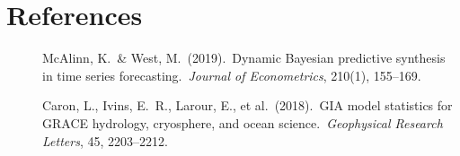 \documentclass[11pt]{article}
\begin{document}
\section*{References}

\begin{description}
  \item[] McAlinn, K.\ \& West, M.\ (2019).\ Dynamic Bayesian predictive synthesis in time series forecasting.\ \textit{Journal of Econometrics}, 210(1), 155--169.
  \item[] Caron, L., Ivins, E.~R., Larour, E., et al.\ (2018).\ GIA model statistics for GRACE hydrology, cryosphere, and ocean science.\ \textit{Geophysical Research Letters}, 45, 2203--2212.
\end{description}
\end{document}
